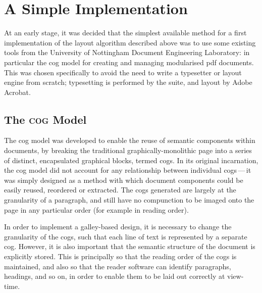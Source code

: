 \section{A Simple Implementation}
At an early stage, it was decided that the simplest available method for a first implementation of the layout algorithm described above was to use some existing tools from the University of Nottingham Document Engineering Laboratory: in particular the \gls{cog} model \cite{Bagley2003} for creating and managing modularised \gls{pdf} documents. This was chosen specifically to avoid the need to write a typesetter or layout engine from scratch; typesetting is performed by the \troff{} suite, and layout by Adobe Acrobat.  %

\subsection{The \textsc{cog} Model}
The \gls{cog} model was developed to enable the reuse of semantic components within \pdf{} documents, by breaking the traditional graphically-monolithic \pdf{} page into a series of distinct, encapsulated graphical blocks, termed \glspl{cog}. In its original incarnation, the \gls{cog} model did not account for any relationship between individual \glspl{cog}\,---\,it was simply designed as a method with which document components could be easily reused, reordered or extracted. The \glspl{cog} generated are largely at the granularity of a paragraph, and still have no compunction to be imaged onto the page in any particular order (for example in reading order).

In order to implement a galley-based design, it is necessary to change the granularity of the \glspl{cog}, such that each line of text is represented by a separate \gls{cog}. However, it is also important that the semantic structure of the document is explicitly stored. This is principally so that the reading order of the \glspl{cog} is maintained, and also so that the reader software can identify paragraphs, headings, and so on, in order to enable them to be laid out correctly at view-time.

